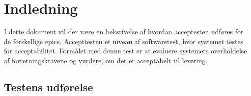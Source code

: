 \chapter{Indledning}
I dette dokument vil der være en beksrivelse af hvordan acceptesten udføres for de forskellige epics. 
Accepttesten et niveau af softwaretest, hvor systemet testes for acceptabilitet. Formålet med denne test er at evaluere systemets overholdelse af forretningskravene og vurdere, om det er acceptabelt til levering.

\section{Testens udførelse}